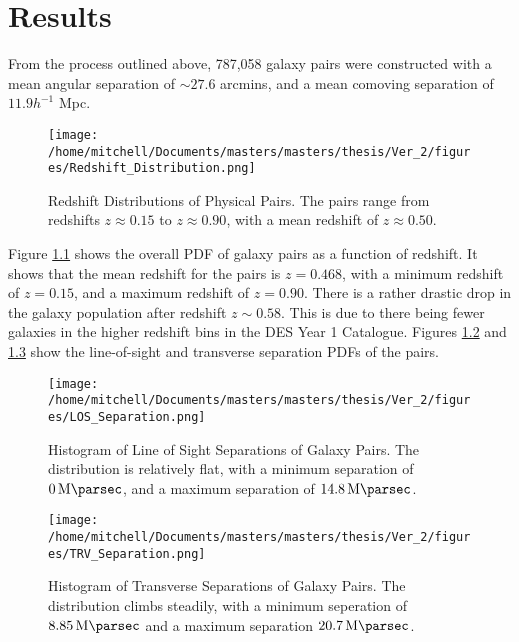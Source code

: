 
\chapter{Results}

From the process outlined above, 787,058 galaxy pairs were constructed with a mean angular separation of $\sim 27.6 $ arcmins, and a mean comoving separation of $11.9 h^{-1}$ Mpc. 

\begin{figure}[H]
\centering
\texttt{[image: /home/mitchell/Documents/masters/masters/thesis/Ver\_2/figures/Redshift\_Distribution.png]}
\caption{Redshift Distributions of Physical Pairs. The pairs range from redshifts $z\approx0.15$ to $z\approx0.90$, with a mean redshift of $z\approx0.50$.}
\label{fig:physical:redshifts}
\end{figure}

Figure \ref{fig:physical:redshifts} shows the overall PDF of galaxy pairs as a function of redshift. It shows that the mean redshift for the pairs is $z=0.468$, with a minimum redshift of $z= 0.15$, and a maximum redshift of $z= 0.90$. There is a rather drastic drop in the galaxy population after redshift $z \sim 0.58$. This is due to there being fewer galaxies in the higher redshift bins in the DES Year 1 Catalogue. Figures \ref{fig:physical:lineofsight} and \ref{fig:physical:transverse} show the line-of-sight and transverse separation PDFs of the pairs.

\begin{figure}[H]
\centering
\texttt{[image: /home/mitchell/Documents/masters/masters/thesis/Ver\_2/figures/LOS\_Separation.png]}
\caption{Histogram of Line of Sight Separations of Galaxy Pairs. The distribution is relatively flat, with a minimum separation of $\SI{0}{\mega\parsec}$, and a maximum separation of $\SI{14.8}{\mega\parsec}$.}
\label{fig:physical:lineofsight}
\end{figure}


\begin{figure}[H]
\centering
\texttt{[image: /home/mitchell/Documents/masters/masters/thesis/Ver\_2/figures/TRV\_Separation.png]}
\caption{Histogram of Transverse Separations of Galaxy Pairs. The distribution climbs steadily, with a minimum seperation of $\SI{8.85}{\mega\parsec}$ and a maximum separation $\SI{20.7}{\mega\parsec}$. }
\label{fig:physical:transverse}
\end{figure}

